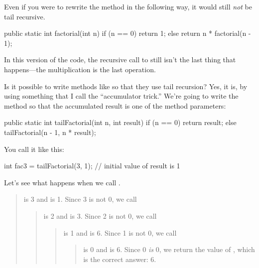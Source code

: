 Even if you were to rewrite the  method in the following way, it would still {\em not} be tail recursive.

\begin{code}
public static int factorial(int n) {
    if (n == 0) {
        return 1;
    } else {
        return n * factorial(n - 1);
    }
}
\end{code}

In this version of the code, the recursive call to  still isn't the last thing that happens---the multiplication is the last operation.

Is it possible to write methods like  so that they use tail recursion? Yes, it is, by using something that I call the ``accumulator trick.'' We're going to write the method so that the accumulated result is one of the method parameters:

\begin{code}
public static int tailFactorial(int n, int result) {
    if (n == 0) {
        return result;
    } else {
        tailFactorial(n - 1, n * result);
    }
}
\end{code}

You call it like this:

\begin{code}
int fac3 = tailFactorial(3, 1); // initial value of result is 1
\end{code}

Let's see what happens when we call .

\vspace{-1ex}
\begin{quote}
 is 3 and  is 1. Since 3 is not 0, we call 
\begin{quote}
 is 2 and  is 3. Since 2 is not 0, we call 
\begin{quote}
 is 1 and  is 6. Since 1 is not 0, we call 
\begin{quote}
 is 0 and  is 6. Since 0 {\em is} 0, we return the value of , which is the correct answer: 6.
\end{quote}
\end{quote}
\end{quote}
\end{quote}
\vspace{-1ex}

